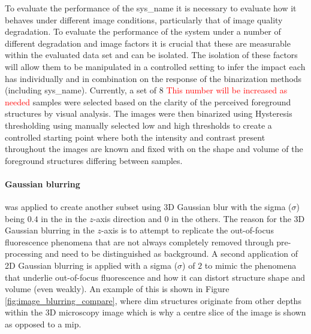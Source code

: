 To evaluate the performance of the \gls{sys_name} it is necessary to evaluate how it behaves under different image conditions, particularly that of image quality degradation. To evaluate the performance of the system under a number of different degradation and image factors it is crucial that these are measurable within the evaluated data set and can be isolated. The isolation of these factors will allow them to be manipulated in a controlled setting to infer the impact each has individually and in combination on the response of the binarization methods (including \gls{sys_name}). Currently, a set of 8 \textcolor{red}{This number will be increased as needed} samples were selected based on the clarity of the perceived foreground structures by visual analysis. The images were then binarized using Hysteresis thresholding using manually selected low and high thresholds to create a controlled starting point where both the intensity and contrast present throughout the images are known and fixed with on the shape and volume of the foreground structures differing between samples. \paragraph{Gaussian blurring} was applied to create another subset using 3D Gaussian blur with the sigma ($\sigma$) being $0.4$ in the in the $z$-axis direction and $0$ in the others. The reason for the 3D Gaussian blurring in the $z$-axis is to attempt to replicate the out-of-focus fluorescence phenomena that are not always completely removed through pre-processing and need to be distinguished as background. A second application of 2D Gaussian blurring is applied with a sigma ($\sigma$) of $2$ to mimic the phenomena that underlie out-of-focus fluorescence and how it can distort structure shape and volume (even weakly). An example of this is shown in Figure \ref{fig:image_blurring_compare}, where dim structures originate from other depths within the 3D microscopy image which is why a centre slice of the image is shown as opposed to a \gls{mip}.

